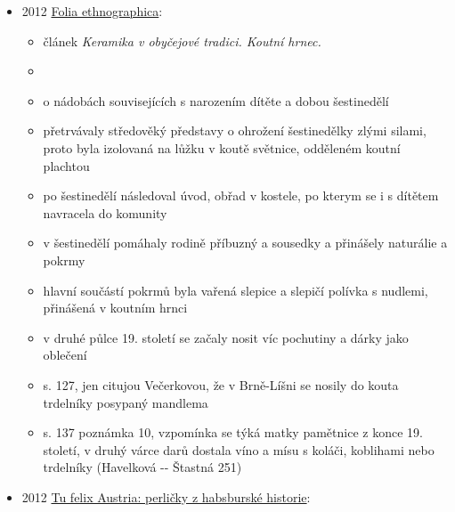 \begin{itemize}
  \begin{itemize}
  \tightlist
  \item
    není online, najít
  \item
    s. 176:

    \begin{itemize}
    \tightlist
    \item
      v některých obcích se na konci masoputního týdne scházela ve
      vybraných domech, pili kávu, svařené víno, jedli koblihy a
      trubičky (rollkrapfen, Ringelkropfen)
    \end{itemize}
  \end{itemize}
\item
  2012
  \href{https://www.digitalniknihovna.cz/mzk/uuid/uuid:40699a90-4f78-11e4-a830-005056827e51}{Folia
  ethnographica}:

  \begin{itemize}
  \tightlist
  \item
    článek \emph{Keramika v obyčejové tradici. Koutní hrnec.}
  \item
  \item
    o nádobách souvisejících s narozením dítěte a dobou šestinedělí
  \item
    přetrvávaly středověký představy o ohrožení šestinedělky zlými
    silami, proto byla izolovaná na lůžku v koutě světnice, odděleném
    koutní plachtou
  \item
    po šestinedělí následoval úvod, obřad v kostele, po kterym se i s
    dítětem navracela do komunity
  \item
    v šestinedělí pomáhaly rodině příbuzný a sousedky a přinášely
    naturálie a pokrmy
  \item
    hlavní součástí pokrmů byla vařená slepice a slepičí polívka s
    nudlemi, přinášená v koutním hrnci
  \item
    v druhé půlce 19. století se začaly nosit víc pochutiny a dárky jako
    oblečení
  \item
    s. 127, jen citujou Večerkovou, že v Brně-Líšni se nosily do kouta
    trdelníky posypaný mandlema
  \item
    s. 137 poznámka 10, vzpomínka se týká matky pamětnice z konce 19.
    století, v druhý várce darů dostala víno a mísu s koláči, koblihami
    nebo trdelníky (Havelková -\/- Štastná 251)
  \end{itemize}
\item
  2012
  \href{https://ceskadigitalniknihovna.cz/uuid/uuid:768aa440-e19e-11e8-bc37-005056827e51}{Tu
  felix Austria: perličky z habsburské historie}:


\end{itemize}
